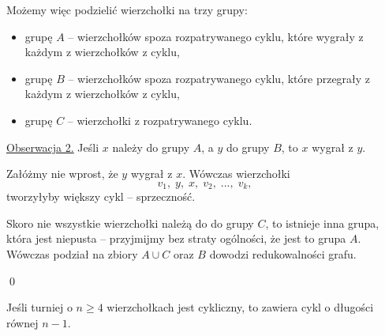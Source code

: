 \vspace{10px}
\noindent
Możemy więc podzielić wierzchołki na trzy grupy:
\begin{itemize}
	\item grupę $A$ -- wierzchołków spoza rozpatrywanego cyklu, które wygrały z każdym z wierzchołków z cyklu,
	\item grupę $B$ -- wierzchołków spoza rozpatrywanego cyklu, które przegrały z każdym z wierzchołków z cyklu,
	\item grupę $C$ -- wierzchołki z rozpatrywanego cyklu.
\end{itemize}

\vspace{10px}
\noindent
\underline{Obserwacja 2.} Jeśli $x$ należy do grupy $A$, a $y$ do grupy $B$, to $x$ wygrał z $y$.

\begin{center}
\end{center}


\vspace{10px}
\noindent
Załóżmy nie wprost, że $y$ wygrał z $x$. Wówczas wierzchołki
\[
	v_1, \; y, \; x, \; v_{2}, \; ..., \; v_k, 
\]
tworzyłyby większy cykl -- sprzeczność.

\vspace{10px}
\noindent
Skoro nie wszystkie wierzchołki należą do do grupy $C$, to istnieje inna grupa, która jest niepusta -- przyjmijmy bez straty ogólności, że jest to grupa $A$. Wówczas podział na zbiory $A \cup C$ oraz $B$ dowodzi redukowalności grafu.

\qed



\noindent
Jeśli turniej o $n \geqslant 4$ wierzchołkach jest cykliczny, to zawiera cykl o długości równej $n - 1$.


